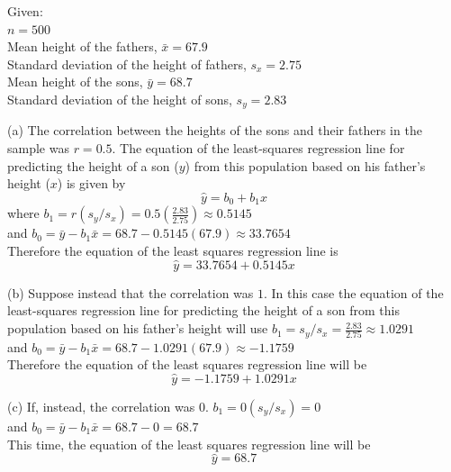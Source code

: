 \documentclass[boxes, qed]{homework}
\begin{document}
\begin{problem}Given:\\
  $n=500$\\
  Mean height of the fathers, $\bar{x}=67.9$\\
  Standard deviation of the height of fathers, $s_x=2.75$\\
  Mean height of the sons, $\bar{y}=68.7$\\
  Standard deviation of the height of sons, $s_y=2.83$
\end{problem}
\begin{solution}
  (a) The correlation between the heights of the sons and their fathers in the sample was $r=0.5$.
    The equation of the least-squares regression line for predicting the height of a son ($y$) from this 
    population based on his father’s height ($x$) is given by
    $$\hat{y}=b_0+b_1x$$
    where $b_1=r(s_y/s_x) = 0.5(\frac{2.83}{2.75}) \approx 0.5145$ \\
    and $b_0=\bar{y}-b_1\bar{x} = 68.7-0.5145(67.9) \approx 33.7654$\\
    
    Therefore the equation of the least squares regression line is
    \begin{equation}
      \hat{y}=33.7654+0.5145x
    \end{equation}
    
  (b) Suppose instead that the correlation was $1$. In this case the equation of the least-squares
    regression line for predicting the height of a son from this population based on his father’s height
    will use $b_1=s_y/s_x = \frac{2.83}{2.75} \approx 1.0291$ \\
    and $b_0=\bar{y}-b_1\bar{x} = 68.7-1.0291(67.9) \approx -1.1759$\\
    
    Therefore the equation of the least squares regression line will be
    \begin{equation}
      \hat{y} = -1.1759 + 1.0291x
    \end{equation}
    
  (c) If, instead, the correlation was $0$. $b_1=0(s_y/s_x) = 0$ \\
    and $b_0=\bar{y}-b_1\bar{x} = 68.7-0 = 68.7$\\

    This time, the equation of the least squares regression line will be
    \begin{equation}
      \hat{y} = 68.7
    \end{equation}


\end{solution}
\end{document}
